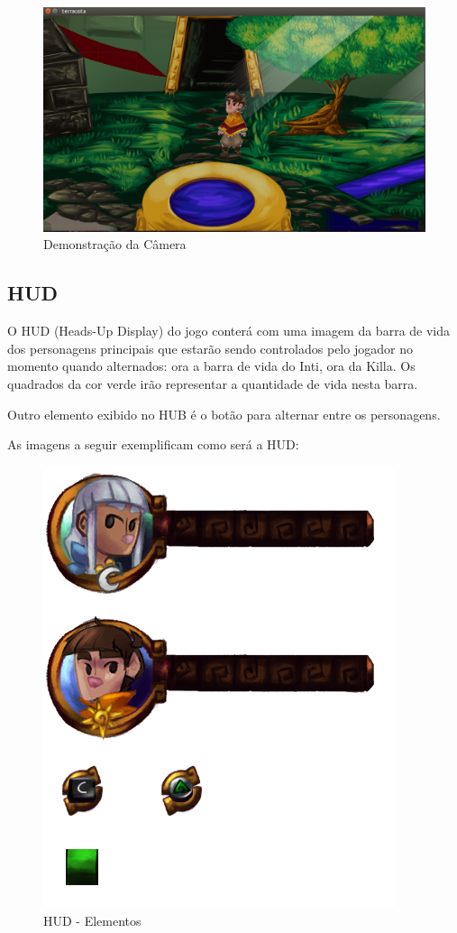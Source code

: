 \documentclass[12pt]{article}
\begin{document}
\begin{figure}[!htb]
    \centering
    \includegraphics[scale=0.37]{camera_hud_01.png}
    \caption{Demonstração da Câmera}
    \label{fig:camera_hud_01}
\end{figure}

\subsection{HUD}
O HUD (Heads-Up Display) do jogo conterá com uma imagem da barra de vida dos
personagens principais que estarão sendo controlados pelo jogador no momento
quando alternados: ora a barra de vida do Inti, ora da Killa. Os quadrados da
cor verde irão representar a quantidade de vida nesta barra.

Outro elemento exibido no HUB é o botão para alternar entre os personagens.

As imagens a seguir exemplificam como será a HUD:

\begin{figure}[!htb]
    \centering
    \includegraphics[scale=0.5]{camera_hud_02.png}
    \caption{HUD - Elementos}
    \label{fig:camera_hud_02}
\end{figure}
\end{document}
